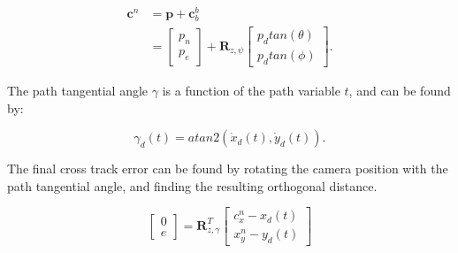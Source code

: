 \begin{equation}
\begin{split}
	\mathbf{c}^n & = \mathbf{p} + \mathbf{c}_b^b \\
	& =
	\begin{bmatrix}
		p_n \\ p_e
	\end{bmatrix}
	+ \mathbf{R}_{z,\psi}
	\begin{bmatrix}
		p_d tan(\theta) \\ p_d tan(\phi)
	\end{bmatrix}.
\end{split}
\end{equation}

The path tangential angle $\gamma$ is a function of the path variable $t$, and can be found by:

\begin{equation}
	\gamma_d(t) = atan2(\dot{x}_d(t),\dot{y}_d(t)).
\end{equation}

The final cross track error can be found by rotating the camera position with the path tangential angle, and finding the resulting orthogonal distance.

\begin{equation}
	\begin{bmatrix}
		0 \\ e
	\end{bmatrix}
	= \mathbf{R}_{z,\gamma}^T
	\begin{bmatrix}
		c_x^n - x_d(t) \\ x_y^n - y_d(t)
	\end{bmatrix}
\end{equation}